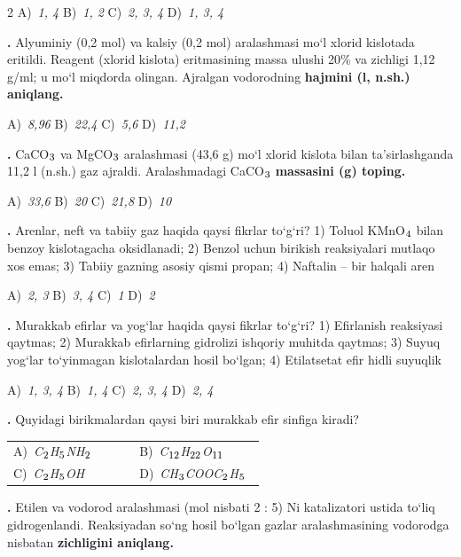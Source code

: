 \documentclass[11pt,a4paper]{article}
\renewcommand{\textsubscript}[1]{\ensuremath{_{\text{\fontsize{8}{8}\selectfont #1}}}}
\newcommand{\qn}[1]{\textbf{\fontsize{11.5}{13}\selectfont #1}}
\newcommand{\qsep}{\par\vspace{13pt}}
\begin{document}
\begin{multicols}{2}
\noindent A)~\textsl{1, 4} \hfill B)~\textsl{1, 2} \hfill C)~\textsl{2, 3, 4} \hfill D)~\textsl{1, 3, 4}\par
\qsep
\noindent\qn{18.} Alyuminiy (0,2 mol) va kalsiy (0,2 mol) aralashmasi mo`l xlorid kislotada eritildi. Reagent (xlorid kislota) eritmasining massa ulushi 20\% va zichligi 1,12 g/ml; u mo`l miqdorda olingan. Ajralgan vodorodning \textbf{hajmini (l, n.sh.) aniqlang.}

\noindent A)~\textsl{8,96} \hfill B)~\textsl{22,4} \hfill C)~\textsl{5,6} \hfill D)~\textsl{11,2}\par
\qsep
\noindent\qn{19.} CaCO\textsubscript{3} va MgCO\textsubscript{3} aralashmasi (43,6 g) mo`l xlorid kislota bilan ta'sirlashganda 11,2 l (n.sh.) gaz ajraldi. Aralashmadagi CaCO\textsubscript{3} \textbf{massasini (g) toping.}

\noindent A)~\textsl{33,6} \hfill B)~\textsl{20} \hfill C)~\textsl{21,8} \hfill D)~\textsl{10}\par
\qsep
\noindent\qn{20.} Arenlar, neft va tabiiy gaz haqida qaysi fikrlar to`g`ri? 1) Toluol KMnO\textsubscript{4} bilan benzoy kislotagacha oksidlanadi; 2) Benzol uchun birikish reaksiyalari mutlaqo xos emas; 3) Tabiiy gazning asosiy qismi propan; 4) Naftalin -- bir halqali aren

\noindent A)~\textsl{2, 3} \hfill B)~\textsl{3, 4} \hfill C)~\textsl{1} \hfill D)~\textsl{2}\par
\qsep
\noindent\qn{21.} Murakkab efirlar va yog`lar haqida qaysi fikrlar to`g`ri? 1) Efirlanish reaksiyasi qaytmas; 2) Murakkab efirlarning gidrolizi ishqoriy muhitda qaytmas; 3) Suyuq yog`lar to`yinmagan kislotalardan hosil bo`lgan; 4) Etilatsetat efir hidli suyuqlik

\noindent A)~\textsl{1, 3, 4} \hfill B)~\textsl{1, 4} \hfill C)~\textsl{2, 3, 4} \hfill D)~\textsl{2, 4}\par
\qsep
\noindent\qn{22.} Quyidagi birikmalardan qaysi biri murakkab efir sinfiga kiradi?

\noindent\begin{tabular}{@{}p{0.47\linewidth}@{}p{0.47\linewidth}@{}}
A)~\textsl{C\textsubscript{2}H\textsubscript{5}NH\textsubscript{2}} & B)~\textsl{C\textsubscript{12}H\textsubscript{22}O\textsubscript{11}} \\
C)~\textsl{C\textsubscript{2}H\textsubscript{5}OH} & D)~\textsl{CH\textsubscript{3}COOC\textsubscript{2}H\textsubscript{5}} \\
\end{tabular}\par
\qsep
\noindent\qn{23.} Etilen va vodorod aralashmasi (mol nisbati 2 : 5) Ni katalizatori ustida to`liq gidrogenlandi. Reaksiyadan so`ng hosil bo`lgan gazlar aralashmasining vodorodga nisbatan \textbf{zichligini aniqlang.}


\end{multicols}
\end{document}

